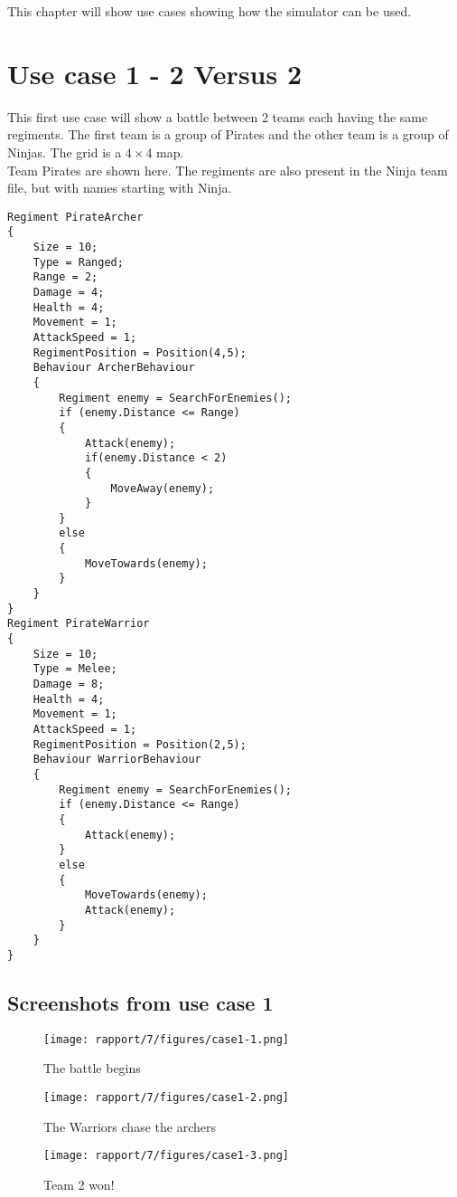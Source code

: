 This chapter will show use cases showing how the simulator can be used.

\section{Use case 1 - 2 Versus 2}
	This first use case will show a battle between 2 teams each having the same regiments.
	The first team is a group of Pirates and the other team is a group of Ninjas. The grid is a $4 \times 4$ map. \\
	Team Pirates are shown here. The regiments are also present in the Ninja team file, but with names starting with Ninja.
\begin{lstlisting}
Regiment PirateArcher
{
	Size = 10;
	Type = Ranged;
	Range = 2;
	Damage = 4;
	Health = 4;
	Movement = 1;
	AttackSpeed = 1;
	RegimentPosition = Position(4,5);
	Behaviour ArcherBehaviour
	{
		Regiment enemy = SearchForEnemies();
		if (enemy.Distance <= Range)
		{
			Attack(enemy);
			if(enemy.Distance < 2)
			{
				MoveAway(enemy);
			}
		}
		else
		{
			MoveTowards(enemy);
		}
	}
}
Regiment PirateWarrior
{
	Size = 10;
	Type = Melee;
	Damage = 8;
	Health = 4;
	Movement = 1;
	AttackSpeed = 1;
	RegimentPosition = Position(2,5);
	Behaviour WarriorBehaviour
	{
		Regiment enemy = SearchForEnemies();
		if (enemy.Distance <= Range)
		{
			Attack(enemy);
		}
		else
		{
			MoveTowards(enemy);
			Attack(enemy);
		}
	}
}
\end{lstlisting}

	\subsection{Screenshots from use case 1}
		\begin{figure}
			\texttt{[image: rapport/7/figures/case1-1.png]}
			\caption{The battle begins}
		\end{figure}
		\begin{figure}
			\texttt{[image: rapport/7/figures/case1-2.png]}
			\caption{The Warriors chase the archers}
		\end{figure}
		\begin{figure}
			\texttt{[image: rapport/7/figures/case1-3.png]}
			\caption{Team 2 won!}
		\end{figure}